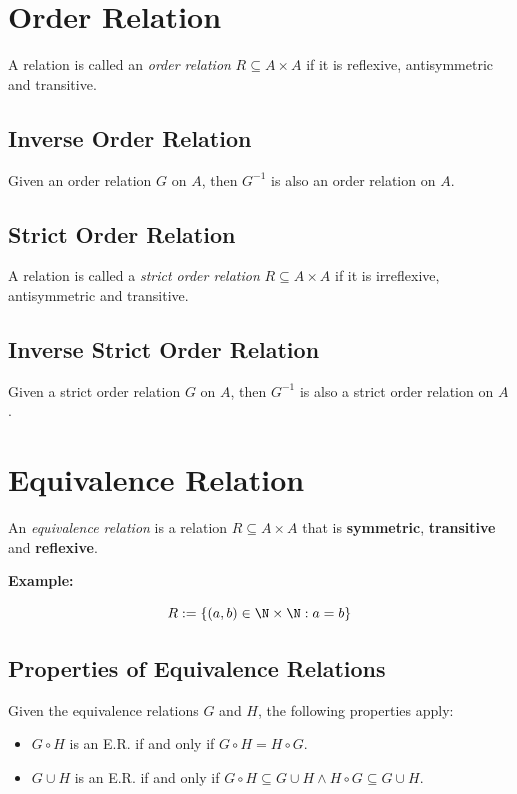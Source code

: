 \section{Order Relation}

A relation is called an \emph{order relation} \(R \subseteq A \times A\) if it is reflexive, antisymmetric and transitive.

\subsection{Inverse Order Relation}

Given an order relation \(G\) on \(A\), then \(G^{-1}\) is also an order relation on \(A\).

\subsection{Strict Order Relation}

A relation is called a \emph{strict order relation} \(R \subseteq A \times A\) if it is irreflexive, antisymmetric and transitive.

\subsection{Inverse Strict Order Relation}

Given a strict order relation \(G\) on \(A\), then \(G^{-1}\) is also a strict order relation on \(A\).

\section{Equivalence Relation}

An \emph{equivalence relation} is a relation \(R \subseteq A \times A\) that is \textbf{symmetric}, \textbf{transitive} and \textbf{reflexive}.

\textbf{Example:}

\[
	R:= \{ (a,b) \in \N \times \N: a = b\}
\]

\subsection{Properties of Equivalence Relations}

Given the equivalence relations \(G\) and \(H\), the following properties apply:

\begin{itemize}

	\item \(G \circ H\) is an E.R. if and only if \(G \circ H = H \circ G\).
	\item \(G \cup H\) is an E.R. if and only if  \(G \circ H \subseteq G \cup H \land H \circ G \subseteq G \cup H\).

\end{itemize}


